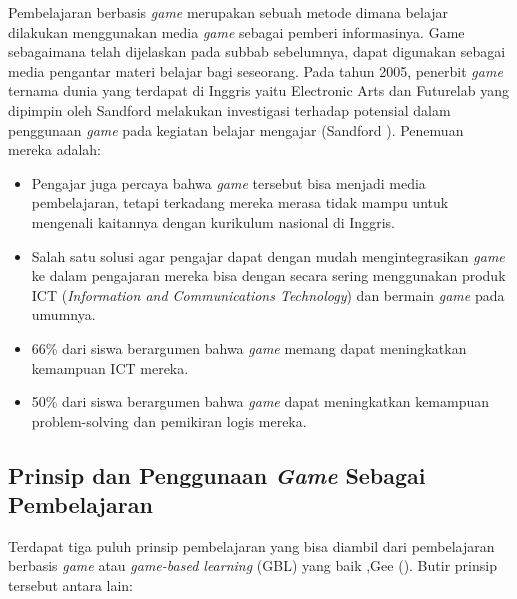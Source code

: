 	Pembelajaran berbasis \textit{game} merupakan sebuah metode dimana belajar dilakukan menggunakan media \textit{game} sebagai pemberi informasinya. Game sebagaimana telah dijelaskan pada subbab sebelumnya, dapat digunakan sebagai media pengantar materi belajar bagi seseorang. Pada tahun 2005, penerbit \textit{game} ternama dunia yang terdapat di Inggris yaitu Electronic Arts dan Futurelab yang dipimpin oleh Sandford melakukan investigasi terhadap potensial dalam penggunaan \textit{game} pada kegiatan belajar mengajar (Sandford \citeyear{paper.futurelab}). Penemuan mereka adalah:
	\begin{itemize}
		\item Pengajar juga percaya bahwa \textit{game} tersebut bisa menjadi media pembelajaran, tetapi terkadang mereka merasa tidak mampu untuk mengenali kaitannya dengan kurikulum nasional di Inggris.
		\item Salah satu solusi agar pengajar dapat dengan mudah mengintegrasikan \textit{game} ke dalam pengajaran mereka bisa dengan secara sering menggunakan produk ICT (\textit{Information and Communications Technology}) dan bermain \textit{game} pada umumnya.
		\item 66\% dari siswa berargumen bahwa \textit{game} memang dapat meningkatkan kemampuan ICT mereka.
		\item 50\% dari siswa berargumen bahwa \textit{game} dapat meningkatkan kemampuan problem-solving dan pemikiran logis mereka.
	\end{itemize}
	
	\subsection{Prinsip dan Penggunaan \textit{Game} Sebagai Pembelajaran}
	
	Terdapat tiga puluh prinsip pembelajaran yang bisa diambil dari pembelajaran berbasis \textit{game} atau \textit{game-based learning} (GBL) yang baik ,Gee (\citeyear{papper.jpgee}). Butir prinsip tersebut antara lain:
	
